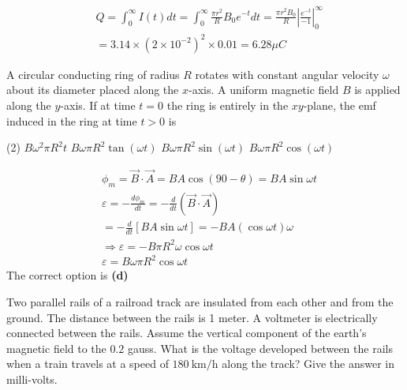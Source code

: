 \begin{enumerate}
\begin{answer}
\begin{align*}
	&Q=\int_{0}^{\infty} I(t) d t=\int_{0}^{\infty} \frac{\pi r^{2}}{R} B_{0} e^{-t} d t=\frac{\pi r^{2} B_{0}}{R}\left|\frac{e^{-t}}{-1}\right|_{0}^{\infty} \\
	&=3.14 \times\left(2 \times 10^{-2}\right)^{2} \times 0.01=6.28 \mu C
	\end{align*}
\end{answer}
\begin{minipage}{\textwidth}
	\item A circular conducting ring of radius $R$ rotates with constant angular velocity $\omega$ about its diameter placed along the $x$-axis. A uniform magnetic field $B$ is applied along the $y$-axis. If at time $t=0$ the ring is entirely in the $x y$-plane, the emf induced in the ring at time $t>0$ is
\end{minipage}
\begin{tasks}(2)
	\task[\textbf{A.}] $B \omega^{2} \pi R^{2} t$
	\task[\textbf{B.}]$B \omega \pi R^{2} \tan (\omega t)$
	\task[\textbf{C.}]$B \omega \pi R^{2} \sin (\omega t)$
	\task[\textbf{D.}]$B \omega \pi R^{2} \cos (\omega t)$
\end{tasks}
\begin{answer}
	\begin{align*}
	&\phi_{m}=\vec{B} \cdot \vec{A}=B A \cos (90-\theta)=B A \sin \omega t\\
		&\varepsilon=-\frac{d \phi_{m}}{d t}=-\frac{d}{d t}(\vec{B} \cdot \vec{A})\\
		&=-\frac{d}{d t}[B A \sin \omega t]=-B A(\cos \omega t) \omega \\
		&\Rightarrow \varepsilon=-B \pi R^{2} \omega \cos \omega t \\
		& \varepsilon=B \omega \pi R^{2} \cos \omega t
	\end{align*}
	The correct option is \textbf{(d)}
\end{answer}
\begin{minipage}{\textwidth}
	\item Two parallel rails of a railroad track are insulated from each other and from the ground. The distance between the rails is 1 meter. A voltmeter is electrically connected between the rails. Assume the vertical component of the earth's magnetic field to the $0.2$ gauss. What is the voltage developed between the rails when a train travels at a speed of $180 \mathrm{~km} / \mathrm{h}$ along the track? Give the answer in milli-volts.
\end{minipage}
\begin{answer}

\end{answer}
\end{enumerate}

